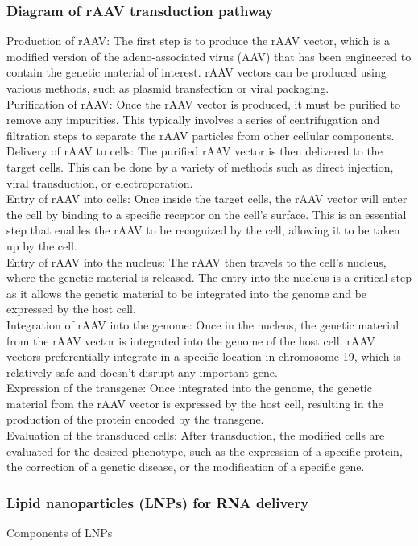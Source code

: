 \begin{itemize}
\begin{itemize}
\subsubsection{Diagram of rAAV transduction pathway}
Production of rAAV: The first step is to produce the rAAV vector, which is a modified version of the adeno-associated virus (AAV) that has been engineered to contain the genetic material of interest. rAAV vectors can be produced using various methods, such as plasmid transfection or viral packaging.
\\Purification of rAAV: Once the rAAV vector is produced, it must be purified to remove any impurities. This typically involves a series of centrifugation and filtration steps to separate the rAAV particles from other cellular components.
\\Delivery of rAAV to cells: The purified rAAV vector is then delivered to the target cells. This can be done by a variety of methods such as direct injection, viral transduction, or electroporation.
\\Entry of rAAV into cells: Once inside the target cells, the rAAV vector will enter the cell by binding to a specific receptor on the cell's surface. This is an essential step that enables the rAAV to be recognized by the cell, allowing it to be taken up by the cell.
\\Entry of rAAV into the nucleus: The rAAV then travels to the cell's nucleus, where the genetic material is released. The entry into the nucleus is a critical step as it allows the genetic material to be integrated into the genome and be expressed by the host cell.
\\Integration of rAAV into the genome: Once in the nucleus, the genetic material from the rAAV vector is integrated into the genome of the host cell. rAAV vectors preferentially integrate in a specific location in chromosome 19, which is relatively safe and doesn't disrupt any important gene.
\\Expression of the transgene: Once integrated into the genome, the genetic material from the rAAV vector is expressed by the host cell, resulting in the production of the protein encoded by the transgene.
\\Evaluation of the transduced cells: After transduction, the modified cells are evaluated for the desired phenotype, such as the expression of a specific protein, the correction of a genetic disease, or the modification of a specific gene.

\subsubsection{Lipid nanoparticles (LNPs) for RNA delivery}
Components of LNPs


\end{itemize}
\end{itemize}
